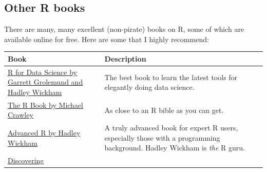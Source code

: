 \documentclass[]{book}
\theoremstyle{definition}
\theoremstyle{definition}
\theoremstyle{remark}
\begin{document}
\subsection{Other R books}\label{other-r-books}

There are many, many excellent (non-pirate) books on R, some of which
are available online for free. Here are some that I highly recommend:

\begin{longtable}[]{@{}ll@{}}
\toprule
\begin{minipage}[b]{0.39\columnwidth}\raggedright\strut
Book\strut
\end{minipage} & \begin{minipage}[b]{0.48\columnwidth}\raggedright\strut
Description\strut
\end{minipage}\tabularnewline
\midrule
\endhead
\begin{minipage}[t]{0.39\columnwidth}\raggedright\strut
\href{http://r4ds.had.co.nz/}{R for Data Science by Garrett Grolemund
and Hadley Wickham}\strut
\end{minipage} & \begin{minipage}[t]{0.48\columnwidth}\raggedright\strut
The best book to learn the latest tools for elegantly doing data
science.\strut
\end{minipage}\tabularnewline
\begin{minipage}[t]{0.39\columnwidth}\raggedright\strut
\href{https://www.amazon.com/R-Book-Michael-J-Crawley/dp/0470973927/ref=sr_1_1?ie=UTF8\&qid=1487759048\&sr=8-1\&keywords=the+r+book}{The
R Book by Michael Crawley}\strut
\end{minipage} & \begin{minipage}[t]{0.48\columnwidth}\raggedright\strut
As close to an R bible as you can get.\strut
\end{minipage}\tabularnewline
\begin{minipage}[t]{0.39\columnwidth}\raggedright\strut
\href{http://adv-r.had.co.nz/}{Advanced R by Hadley Wickham}\strut
\end{minipage} & \begin{minipage}[t]{0.48\columnwidth}\raggedright\strut
A truly advanced book for expert R users, especially those with a
programming background. Hadley Wickham is \emph{the} R guru.\strut
\end{minipage}\tabularnewline
\begin{minipage}[t]{0.39\columnwidth}\raggedright\strut
\href{https://www.amazon.com/Discovering-Statistics-Using-Andy-Field/dp/1446200469/ref=sr_1_2?ie=UTF8\&qid=1487759316\&sr=8-2\&keywords=statistics+with+r}{Discovering
}
\end{minipage}
\end{longtable}
\end{document}
